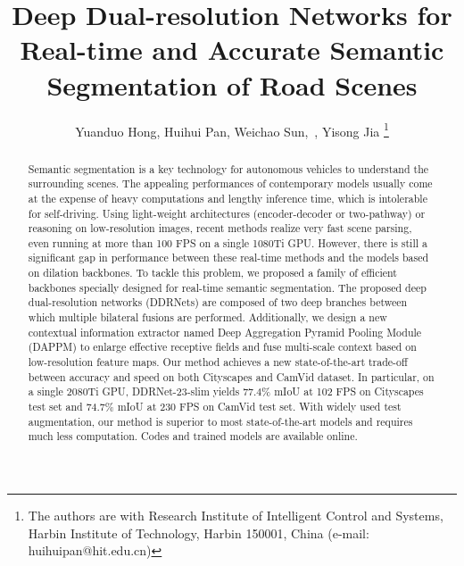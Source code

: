 \documentclass[journal]{IEEEtran}
\begin{document}
\title{Deep Dual-resolution Networks for Real-time and Accurate Semantic Segmentation of Road Scenes}

\author{Yuanduo Hong, Huihui Pan, Weichao Sun,~, Yisong Jia \thanks{The authors are with Research Institute of Intelligent Control and Systems,
Harbin Institute of Technology, Harbin 150001, China (e-mail: huihuipan@hit.edu.cn)}}



















\maketitle

\begin{abstract}
Semantic segmentation is a key technology for autonomous vehicles to understand the surrounding scenes. The appealing performances of contemporary models usually come at the expense of heavy computations and lengthy inference time, which is intolerable for self-driving. Using light-weight architectures (encoder-decoder or two-pathway) or reasoning on low-resolution images, recent methods realize very fast scene parsing, even running at more than 100 FPS on a single 1080Ti GPU. However, there is still a significant gap in performance between these real-time methods and the models based on dilation backbones. To tackle this problem, we proposed a family of efficient backbones specially designed for real-time semantic segmentation. The proposed deep dual-resolution networks (DDRNets) are composed of two deep branches between which multiple bilateral fusions are performed. Additionally, we design a new contextual information extractor named Deep Aggregation Pyramid Pooling Module (DAPPM) to enlarge effective receptive fields and fuse multi-scale context based on low-resolution feature maps. Our method achieves a new state-of-the-art trade-off between accuracy and speed on both Cityscapes and CamVid dataset. In particular, on a single 2080Ti GPU, DDRNet-23-slim yields 77.4$\%$ mIoU at 102 FPS on Cityscapes test set and 74.7$\%$ mIoU at 230 FPS on CamVid test set. With widely used test augmentation, our method is superior to most state-of-the-art models and requires much less computation. Codes and trained models are available online.

\end{abstract}
\end{document}
